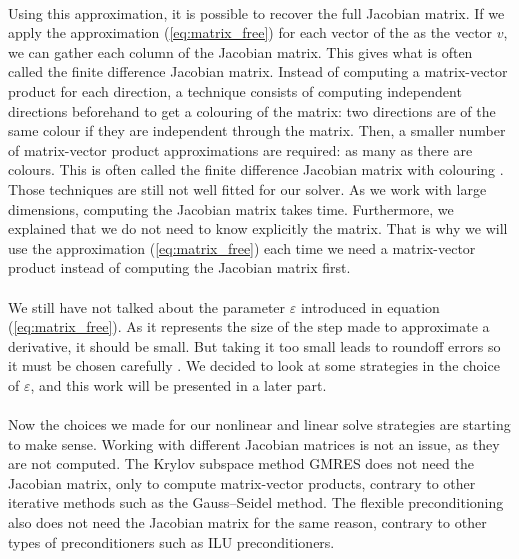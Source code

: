       \paragraph{}
      Using this approximation, it is possible to recover the full Jacobian matrix.
      If we apply the approximation (\ref{eq:matrix_free}) for each vector of the  as the vector $v$, we can gather each column of the Jacobian matrix.
      This gives what is often called the finite difference Jacobian matrix.
      Instead of computing a matrix-vector product for each direction, a technique consists of computing independent directions beforehand to get a colouring of the matrix: two directions are of the same colour if they are independent through the matrix.
      Then, a smaller number of matrix-vector product approximations are required: as many as there are colours.
      This is often called the finite difference Jacobian matrix with colouring \cite{GebremedhinMannePothen2005}.
      Those techniques are still not well fitted for our solver.
      As we work with large dimensions, computing the Jacobian matrix takes time.
      Furthermore, we explained that we do not need to know explicitly the matrix.
      That is why we will use the approximation (\ref{eq:matrix_free}) each time we need a matrix-vector product instead of computing the Jacobian matrix first.

      \paragraph{}
      We still have not talked about the parameter $\varepsilon$ introduced in equation (\ref{eq:matrix_free}).
      As it represents the size of the step made to approximate a derivative, it should be small.
      But taking it too small leads to roundoff errors so it must be chosen carefully \cite{KnollKeyes2004}.
      We decided to look at some strategies in the choice of $\varepsilon$, and this work will be presented in a later part.

      \paragraph{}
      Now the choices we made for our nonlinear and linear solve strategies are starting to make sense.
      Working with different Jacobian matrices is not an issue, as they are not computed.
      The Krylov subspace method GMRES does not need the Jacobian matrix, only to compute matrix-vector products, contrary to other iterative methods such as the Gauss--Seidel method.
      The flexible preconditioning also does not need the Jacobian matrix for the same reason, contrary to other types of preconditioners such as ILU preconditioners.


